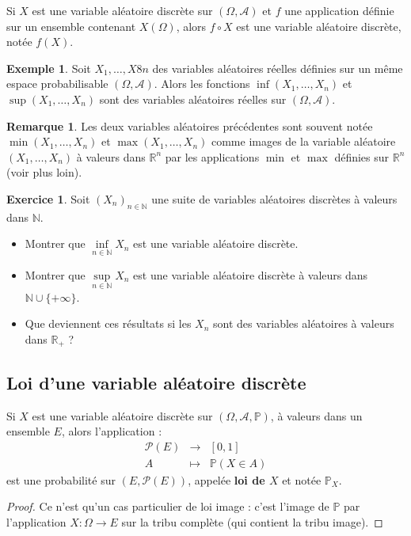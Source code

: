 \documentclass[french]{article}
\renewcommand{\P}{\mathbb{P}}
\newcommand{\N}{\mathbb{N}}
\newcommand{\R}{\mathbb{R}}
\theoremstyle{plain}
\theoremstyle{definition}
\newtheorem*{ex}{Exemple}
\newtheorem{exo}{Exercice}
\newtheorem*{rmq}{Remarque}
\theoremstyle{remark}
\begin{document}
\begin{thm}{}%
	Si $X$ est une variable aléatoire discrète sur $(\Omega,\mathcal{A})$ et $f$ une application définie sur un ensemble contenant $X(\Omega)$, alors $f\circ X$ est une variable aléatoire discrète, notée $f(X)$.
\end{thm}

\begin{ex}
	Soit $X_1,\ldots,X8n$ des variables aléatoires réelles définies sur un même espace probabilisable $(\Omega,\mathcal{A})$. Alors les fonctions $\inf(X_1,\ldots,X_n)$ et $\sup(X_1,\ldots,X_n)$ sont des variables aléatoires réelles sur $(\Omega,\mathcal{A})$.
\end{ex}

\begin{rmq}
	Les deux variables aléatoires précédentes sont souvent notée $\min(X_1,\ldots,X_n)$ et $\max(X_1,\ldots,X_n)$ comme images de la variable aléatoire $(X_1,\ldots,X_n)$ à valeurs dans $\R^n$ par les applications $\min$ et $\max$ définies sur $\R^n$ (voir plus loin).
\end{rmq}

\begin{exo}
	Soit $(X_n)_{n\in\N}$ une suite de variables aléatoires discrètes à valeurs dans $\N$.
	\begin{itemize}
		\item Montrer que $\underset{n\in\N}{\inf}X_n$ est une variable aléatoire discrète.
		\item Montrer que $\underset{n\in\N}{\sup}X_n$ est une variable aléatoire discrète à valeurs dans $\N\cup\{+\infty\}$.
		\item Que deviennent ces résultats si les $X_n$ sont des variables aléatoires à valeurs dans $\R_+$ ?
	\end{itemize}
\end{exo}

\subsection{Loi d'une variable aléatoire discrète}

\begin{thm}{}%
	Si $X$ est une variable aléatoire discrète sur $(\Omega,\mathcal{A},\P)$, à valeurs dans un ensemble $E$, alors l'application :
	$$\begin{array}{rcl}
		\mathcal{P}(E)&\longrightarrow&[0,1]\\
		A&\longmapsto&\P(X\in A)
	\end{array}$$ est une probabilité sur $(E,\mathcal{P}(E))$, appelée \textbf{loi de $X$} et notée $\P_X$.
\end{thm}
\begin{proof}
	Ce n'est qu'un cas particulier de loi image : c'est l'image de $\P$ par l'application $X:\Omega\to E$ sur la tribu complète (qui contient la tribu image).
\end{proof}
\end{document}
